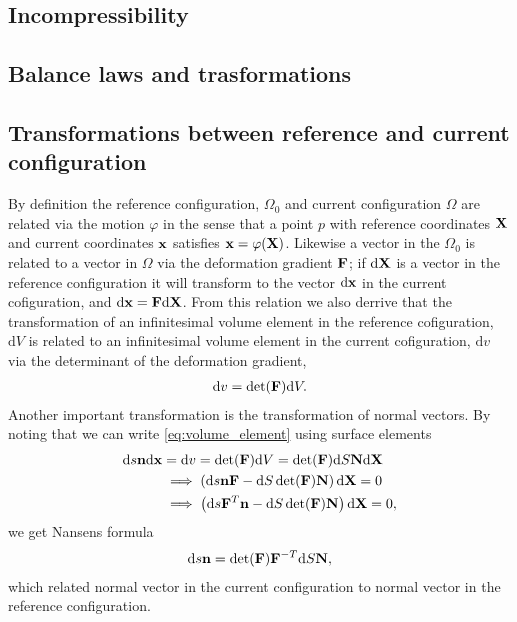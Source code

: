 \subsection{Incompressibility}






\subsection{Balance laws and trasformations}

\subsection{Transformations between reference and current
  configuration}
By definition the reference configuration, $\Omega_0$ and current
configuration $\Omega$ are related via the motion $\varphi$ in the
sense that a point $p$ with reference coordinates $\mathbf{X}$ and current
coordinates $\mathbf{x}$ satisfies $\mathbf{x} = \varphi(\mathbf{X})$. Likewise a
vector in the $\Omega_0$ is related to a vector in $\Omega$ via the
deformation gradient $\mathbf{F}$; if $\mathrm{d}\mathbf{X}$ is a vector in the
reference configuration it will transform to the vector
$\mathrm{d}\mathbf{x}$ in the current cofiguration, and $\mathrm{d}\mathbf{x} =
\mathbf{F} \mathrm{d}\mathbf{X}$. From this relation we also derrive that the
transformation of an infinitesimal volume element in the reference
cofiguration, $\mathrm{d}V$ is related to an infinitesimal volume
element in the current cofiguration, $\mathrm{d}v$  via the determinant of the
deformation gradient,
\begin{align}
  \mathrm{d}v =\det(\mathbf{F}) \mathrm{d}V.
  \label{eq:volume_element}
\end{align}
Another important transformation is the transformation of normal
vectors. By noting that we can write \eqref{eq:volume_element} using
surface elements
\begin{align*}
  \mathrm{d}s \mathbf{n} \mathrm{d}\mathbf{x}  &= \mathrm{d}v = \det(\mathbf{F}) \mathrm{d}V = \det(\mathbf{F}) \mathrm{d}S  \mathbf{N} \mathrm{d}\mathbf{X}\\
  &\implies \left( \mathrm{d}s \mathbf{n} \mathbf{F}  - \mathrm{d}S \det(\mathbf{F}) \mathbf{N} \right) \mathrm{d}\mathbf{X} = 0\\
  &\implies \left( \mathrm{d}s \mathbf{F}^T \mathbf{n}  - \mathrm{d}S \det(\mathbf{F}) \mathbf{N} \right) \mathrm{d}\mathbf{X} = 0,\\
\end{align*}
we get Nansens formula
\begin{align}
  \mathrm{d}s \mathbf{n}  =  \det(\mathbf{F}) \mathbf{F}^{-T} \mathrm{d}S \mathbf{N},
\end{align}
which related normal vector in the current configuration to normal
vector in the reference configuration.


